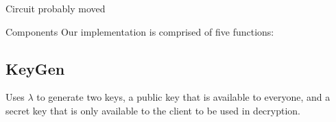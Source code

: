 \documentclass[a0,portrait]{a0poster}
\begin{document}
\begin{multicols}{2}
\begin{slide}{Circuit probably moved}





\end{slide}


\begin{slide}{Components}
Our implementation is comprised of five functions:
\\

\subsection*{KeyGen}
\hspace{1em}Uses \(\lambda\) to generate two keys, a public key that is available to everyone, and a secret key that is only available to the client to be used in decryption. 


\end{slide}
\end{multicols}
\end{document}
